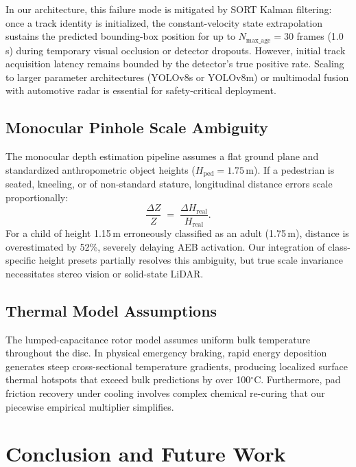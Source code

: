 \documentclass[3p,twocolumn]{elsarticle}
\begin{document}
In our architecture, this failure mode is mitigated by SORT Kalman filtering: once a track identity is initialized, the constant-velocity state extrapolation sustains the predicted bounding-box position for up to $N_{\text{max\_age}} = 30$ frames (1.0\,s) during temporary visual occlusion or detector dropouts. However, initial track acquisition latency remains bounded by the detector's true positive rate. Scaling to larger parameter architectures (YOLOv8s or YOLOv8m) or multimodal fusion with automotive radar is essential for safety-critical deployment.

\subsection{Monocular Pinhole Scale Ambiguity}
The monocular depth estimation pipeline assumes a flat ground plane and standardized anthropometric object heights ($H_{\text{ped}} = 1.75$\,m). If a pedestrian is seated, kneeling, or of non-standard stature, longitudinal distance errors scale proportionally:
\begin{equation}
  \frac{\Delta Z}{Z} \;=\; \frac{\Delta H_{\text{real}}}{H_{\text{real}}}.
  \label{eq:depth_error}
\end{equation}
For a child of height 1.15\,m erroneously classified as an adult (1.75\,m), distance is overestimated by 52\%, severely delaying AEB activation. Our integration of class-specific height presets partially resolves this ambiguity, but true scale invariance necessitates stereo vision or solid-state LiDAR.

\subsection{Thermal Model Assumptions}
The lumped-capacitance rotor model assumes uniform bulk temperature throughout the disc. In physical emergency braking, rapid energy deposition generates steep cross-sectional temperature gradients, producing localized surface thermal hotspots that exceed bulk predictions by over 100$^\circ$C. Furthermore, pad friction recovery under cooling involves complex chemical re-curing that our piecewise empirical multiplier simplifies.

\section{Conclusion and Future Work}
\label{sec:conclusion}
\end{document}
